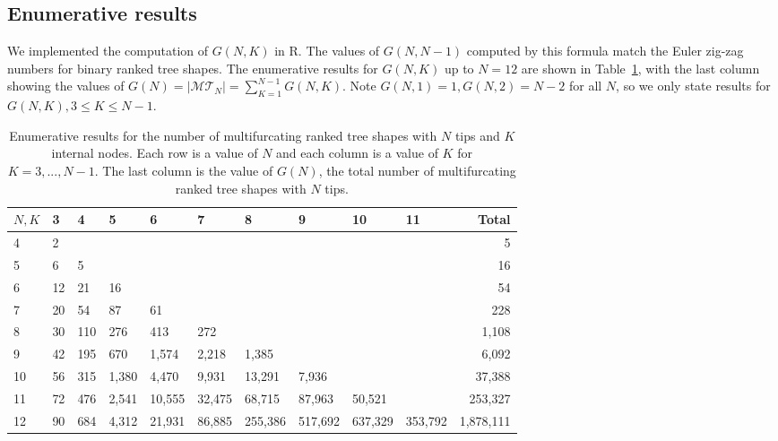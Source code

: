 \documentclass{article}
\begin{document}
\subsection{Enumerative results}

We implemented the computation of $G(N,K)$ in R. The values of $G(N, N-1)$ computed by this formula match the Euler zig-zag numbers for binary ranked tree shapes. The enumerative results for $G(N,K)$ up to $N=12$ are shown in Table~\ref{tab:num_multif}, with the last column showing the values of $G(N) = |\mathcal{MT}_N| = \sum_{K=1}^{N-1} G(N, K)$. Note $G(N, 1)= 1, G(N, 2) = N-2$ for all $N$, so we only state results for $G(N,K), 3\leq K \leq N-1$. 

\begin{table}[H]
\begin{tabular}{l|lllllllll|r}
$N, K$ & 3  & 4   & 5    & 6    & 7    & 8     & 9  &10 & 11   & Total \\ \hline 
4    & 2  &     &      &      &      &       &   &&  & 5 \\
5    & 6  & 5   &      &      &      &       &   &&  &16 \\
6    & 12 & 21  & 16   &      &      &       &   &  & & 54\\
7    & 20 & 54  & 87   & 61   &      &       &   & &  & 228\\
8    & 30 & 110 & 276  & 413  & 272  &       &   & &  & 1,108\\
9    & 42 & 195 & 670  & 1,574 & 2,218 & 1,385  &   & & &6,092 \\
10   & 56 & 315 & 1,380 & 4,470 & 9,931 & 13,291 & 7,936 && & 37,388\\
11   &  72  & 476 & 2,541 &10,555 &32,475& 68,715& 87,963& 50,521 & & 253,327\\
12 & 90   & 684 &  4,312 & 21,931 & 86,885 &255,386 & 517,692 & 637,329 & 353,792 & 1,878,111
\end{tabular}
\caption{Enumerative results for the number of multifurcating ranked tree shapes with $N$ tips and $K$ internal nodes. Each row is a value of $N$ and each column is a value of $K$ for $K=3,...,N-1$. The last column is the value of $G(N)$, the total number of multifurcating ranked tree shapes with $N$ tips.}
\label{tab:num_multif}
\end{table}

\end{document}
